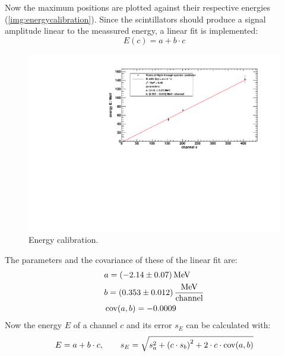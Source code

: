 
Now the maximum positions are plotted against their respective energies (\autoref{img:energycalibration}). Since the scintillators should produce a signal amplitude linear to the 
meassured energy, a linear fit is implemented:
\begin{equation}
    E(c) = a + b \cdot c
\end{equation}
\begin{figure}[H]
\begin{center}
  \includegraphics[width=\textwidth]{../img/energyCalibration.pdf}
  \caption{Energy calibration.}
  \label{img:energycalibration}
\end{center}
\end{figure}
The parameters and the covariance of these of the linear fit are:
\begin{equation}
    \begin{split}
        & a = (-2.14 \pm 0.07) \, \text{MeV} \\
        & b = (0.353 \pm 0.012) \, \frac{\text{MeV}}{\text{channel}} \\
        & \operatorname{cov}(a, b) = -0.0009
    \end{split}
\end{equation}
Now the energy $E$ of a channel $c$ and its error $s_E$ can be calculated with:
\begin{equation}
\label{eq:ecalibration}
    E = a + b \cdot c, \qquad s_E = \sqrt{s_a^2 + \left(c \cdot s_b \right)^2 + 2 \cdot c \cdot \operatorname{cov}(a,b)}
\end{equation}

